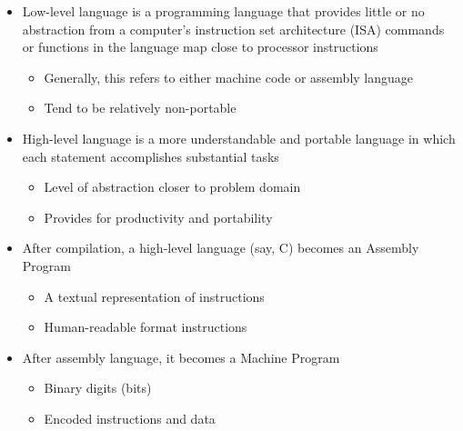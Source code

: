 \begin{itemize}
\begin{enumerate}
    \end{enumerate}

  \item Low-level language is a programming language that provides little or no abstraction from a computer's instruction set architecture (ISA) commands or functions in the language map close to processor instructions

    \begin{itemize}

      \item Generally, this refers to either machine code or assembly language

      \item Tend to be relatively non-portable

    \end{itemize}

  \item High-level language is a more understandable and portable language in which each statement accomplishes substantial tasks

    \begin{itemize}

      \item Level of abstraction closer to problem domain

      \item Provides for productivity and portability

    \end{itemize}

  \item After compilation, a high-level language (say, C) becomes an Assembly Program

    \begin{itemize}

      \item A textual representation of instructions

      \item Human-readable format instructions

    \end{itemize}

  \item After assembly language, it becomes a Machine Program

    \begin{itemize}

      \item Binary digits (bits)

      \item Encoded instructions and data


\end{itemize}
\end{itemize}
